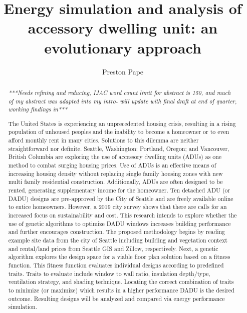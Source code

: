 \documentclass[sagev,doublespace,times,Review]{sagej}
\begin{document}

\title{Energy simulation and analysis of accessory dwelling unit: 
an evolutionary approach}

\author{Preston Pape}




\begin{abstract}
\textit{***Needs refining and reducing, IJAC word count limit for abstract is 150, and much of my abstract was adapted into my intro- will update with final draft at end of quarter, working findings in***}

The United States is experiencing an unprecedented housing crisis, resulting in a rising population of unhoused peoples and the inability to become a homeowner or to even afford monthly rent in many cities. Solutions to this dilemma are neither straightforward nor definite. Seattle, Washington; Portland, Oregon; and Vancouver, British Columbia are exploring the use of accessory dwelling units (ADUs) as one method to combat surging housing prices. Use of ADUs is an effective means of increasing housing density without replacing single family housing zones with new multi family residential construction. Additionally, ADUs are often designed to be rented, generating supplementary income for the homeowner. Ten detached ADU (or DADU) designs are pre-approved by the City of Seattle and are freely available online to entice homeowners. However, a 2019 city survey shows that there are calls for an increased focus on sustainability and cost. This research intends to explore whether the use of genetic algorithms to optimize DADU windows increases building performance and further encourages construction. The proposed methodology begins by reading example site data from the city of Seattle including building and vegetation context and rental/land prices from Seattle GIS and Zillow, respectively. Next, a genetic algorithm explores the design space for a viable floor plan solution based on a fitness function. This fitness function evaluates individual designs according to predefined traits. Traits to evaluate include window to wall ratio, insulation depth/type, ventilation strategy, and shading technique. Locating the correct combination of traits to minimize (or maximize) which results in a higher performance DADU is the desired outcome. Resulting designs will be analyzed and compared via energy performance simulation. 
\end{abstract}
\end{document}
